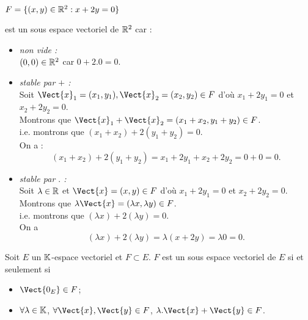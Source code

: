 \documentclass{book}
\begin{document}
\begin{Exemple}
$F=\{(x,y)\in\mathbb{R}^2:x+2y=0\}$  est un sous espace vectoriel de $\mathbb{R}^2$ 
car :
\begin{itemize}
\item \textit{non vide :}\\
$(0,0)\in \mathbb{R}^2$ car $0+2.0=0.$
\item \textit{stable par $+$ :}\\
Soit $\Vect{x}_1=(x_1,y_1),\Vect{x}_2=(x_2,y_2) \in F $ d'où $ x_1+2y_1=0$ et $ x_2+2y_2=0$.\\
Montrons que $\Vect{x}_1+\Vect{x}_2=(x_1+x_2,y_1+y_2)\in F$.\\
i.e. montrons que $(x_1+x_2)+2(y_1+y_2)=0$.\\
On a :
$$(x_1+x_2)+2(y_1+y_2)= x_1+2y_1 + x_2+2y_2 = 0+0 =0.$$
\item
  \textit{stable par $.$ :} \\
Soit $\lambda\in \mathbb{R}$ et $\Vect{x}=(x,y)\in F $ d'où $ x_1+2y_1=0$ et $ x_2+2y_2=0$.\\
Montrons que $\lambda\Vect{x}=( \lambda x,\lambda  y)\in F$.\\
i.e. montrons que $(\lambda x)+2(\lambda  y)=0$.\\
On a 
$$(\lambda x)+2(\lambda  y)= \lambda (x +2 y) = \lambda 0 =0.$$  
\end{itemize}
\end{Exemple}

\begin{Proposition}
Soit $E$ un $\mathbb{K} $-espace vectoriel et $F\subset E$.
$F$ est un sous espace vectoriel  de $E$ si et seulement si
\begin{itemize}
\item
  $\Vect{0_E}\in F$;
\item
  $\forall \lambda  \in \mathbb{K} $, $\forall  \Vect{x},\Vect{y} \in F$, $\lambda .\Vect{x} + \Vect{y} \in  F$.
\end{itemize}
\end{Proposition}
\end{document}
